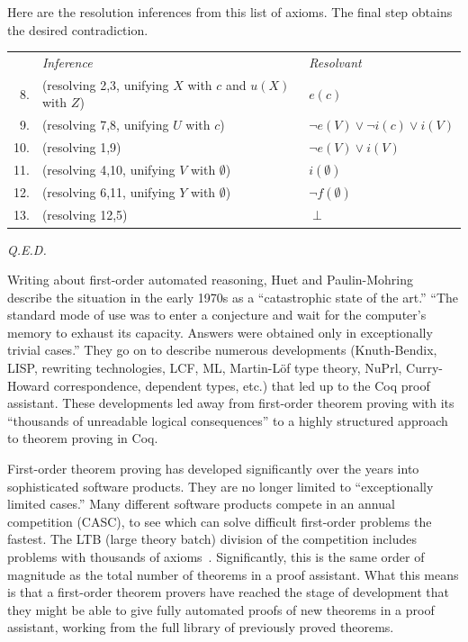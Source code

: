 \documentclass{llncs}
\begin{document}
{{Here are the resolution inferences from this list of axioms. The final step obtains the
desired contradiction. 

\smallskip
\begin{tabular}{lll}
{\it }&{\it Inference}&{\it Resolvant}\\
~8.&(resolving 2,3, unifying $X$ with $c$ and $u(X)$ with $Z$)~~~~~&$e(c)$\\
~9.&(resolving 7,8, unifying $U$ with $c$)~~~&$\lnot e(V) \lor \lnot i(c) \lor i(V)$\\
10.&(resolving 1,9)~~~&$\lnot e(V) \lor  i(V)$\\
11.&(resolving 4,10, unifying $V$ with $\emptyset$)~~~&$i(\emptyset)$\\
12.&(resolving 6,11, unifying $Y$ with $\emptyset$)~~~&$\lnot f(\emptyset)$\\
13.&(resolving 12,5)~~~&$\perp$\\
\end{tabular}

{{\it Q.E.D.}}

}}

\newpage


Writing about first-order automated reasoning, Huet and Paulin-Mohring
\cite{Coq} describe the situation in the early 1970s as a
``catastrophic state of the art.''  ``The standard mode of use was to
enter a conjecture and wait for the computer's memory to exhaust its
capacity.  Answers were obtained only in exceptionally trivial
cases.'' %
They go on to describe numerous developments (Knuth-Bendix, LISP,
rewriting technologies, LCF, ML, Martin-L\"of type theory, NuPrl,
Curry-Howard correspondence, dependent types, etc.) that led up to the
Coq proof assistant.  These developments led away from first-order
theorem proving with its ``thousands of unreadable logical
consequences'' to a highly structured approach to theorem proving in
Coq.


First-order theorem proving has developed significantly over the years
into sophisticated software products.  They are no longer limited to
``exceptionally limited cases.''   Many different
software products compete in an annual competition (CASC), to see
which can solve difficult first-order problems the fastest.  The LTB
(large theory batch) division of the competition includes problems
with thousands of axioms~\cite{PSST}.  Significantly, this is the same order of
magnitude as the total number of theorems in a proof assistant.  What
this means is that a first-order theorem provers have reached the
stage of development that they might be able to give fully automated
proofs of new theorems in a proof assistant, working from the full
library of previously proved theorems.
\end{document}
